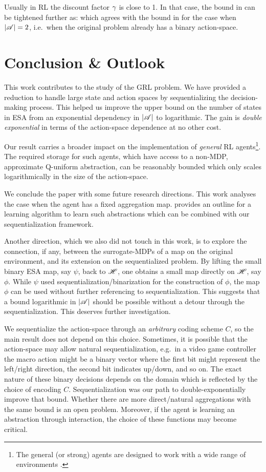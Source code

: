 \documentclass{article} %
\begin{document}
Usually in RL the discount factor $\gamma$ is close to 1. In that case, the bound in  can be tightened further as:
\beq
\abs{\S} \lesssim {}
\eeq
which agrees with the bound in  for the case when ${\left\lvert\mathscr{A}\right\rvert} = 2$, i.e.\ when the original problem already has a binary action-space.

\section{Conclusion \& Outlook}\label{sec:conclusion}

This work contributes to the study of the GRL problem. We have provided a reduction to handle large state and action spaces by sequentializing the decision-making process.
This helped us improve the upper bound on the number of states in ESA from an exponential dependency in ${\left\lvert\mathscr{A}\right\rvert}$ to logarithmic. The gain is \emph{double exponential} in terms of the action-space dependence at no other cost.

Our result carries a broader impact on the implementation of \emph{general} RL agents\footnote{The general (or strong) agents are designed to work with a wide range of environments \cite{Hutter2000}.}. The required storage for such agents, which have access to a non-MDP, approximate Q-uniform abstraction, can be reasonably bounded which only scales logarithmically in the size of the action-space.

We conclude the paper with some future research directions. This work analyses the case when the agent has a fixed aggregation map. \citet{Hutter2016} provides an outline for a learning algorithm to learn such abstractions which can be combined with our sequentialization framework.

Another direction, which we also did not touch in this work, is to explore the connection, if any, between the surrogate-MDPs of a map on the original environment, and its extension on the sequentialized problem. By lifting the small binary ESA map, say $\psi$, back to $\mathscr{H}$, one obtains a small map directly on $\mathscr{H}$, say $\phi$. While $\psi$ used sequentialization/binarization for the construction of $\phi$, the map $\phi$ can be used without further referencing to sequentialization. This suggests that a bound logarithmic in ${\left\lvert\mathscr{A}\right\rvert}$ should be possible without a detour through the sequentialization. This deserves further investigation.

We sequentialize the action-space through an \emph{arbitrary} coding scheme $C$, so the main result does not depend on this choice. Sometimes, it is possible that the action-space may allow natural sequentialization, e.g.\ in a video game controller the macro action might be a binary vector where the first bit might represent the left/right direction, the second bit indicates up/down, and so on. The exact nature of these binary decisions depends on the domain which is reflected by the choice of encoding $C$. Sequentialization was our path to double-exponentially improve that bound. Whether there are more direct/natural aggregations with the same bound is an open problem. Moreover, if the agent is learning an abstraction through interaction, the choice of these functions may become critical.
\end{document}
